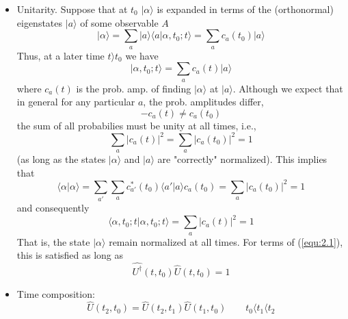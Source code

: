\begin{itemize}
  \item Unitarity. Suppose that at $t_0$ $\vert \alpha\rangle $ is
    expanded in terms of the (orthonormal) eigenstates $\vert a\rangle $
    of some observable $A$
    \begin{equation}
      \vert \alpha\rangle  = \sum_a \vert a\rangle \langle a\vert \alpha,t_0;t\rangle  = \sum_a
      c_a(t_0)\vert a\rangle 
      \label{equ:2.2}
    \end{equation}
    Thus, at a later time $t \rangle  t_0$ we have
    \begin{equation}
      \vert \alpha,t_0;t\rangle  = \sum_a c_a(t) \vert a\rangle 
      \label{equ:2.3}
    \end{equation}
    where $c_a(t)$ is the prob. amp. of finding $\vert \alpha\rangle $
    at $\vert a\rangle $.
    Although we expect that in general for any particular
    $a$, the prob. amplitudes differ,
    $$-
      c_a(t) \neq c_a(t_0)
    $$
    the sum of all probabilies must be unity at all times,
    i.e.,
    \begin{equation}
      \sum_a \vert c_a(t)\vert ^2 = \sum_a \vert c_a(t_0)\vert ^2 = 1
      \label{equ:2.4}
    \end{equation}
    (as long as the states $\vert \alpha\rangle $ and $\vert a\rangle $ are
    "correctly" normalized).
    This implies that
    \begin{equation}
      \langle \alpha\vert \alpha\rangle  = \sum_{a'} \sum_a c_{a'}^*(t_0)
      \langle a'\vert a\rangle   c_a(t_0) = \sum_a \vert c_a(t_0)\vert ^2 = 1
      \label{equ:2.5}
    \end{equation}
    and consequently
    \begin{equation}
      \langle \alpha,t_0;t\vert \alpha,t_0;t\rangle  = \sum_a \vert c_a(t)\vert ^2 = 1
      \label{equ:2.6}
    \end{equation}
    That is, the state $\vert \alpha\rangle $ remain normalized at all
    times. For terms of (\ref{equ:2.1}), this is satisfied as
    long as
    \begin{equation}
      \hat{U^\dagger}(t, t_0) \hat{U}(t,t_0) = 1
      \label{equ:2.7}
    \end{equation}
  \item Time composition:
    \begin{equation}
      \hat{U}(t_2,t_0) = \hat{U}(t_2,t_1) \hat{U}(t_1,t_0)
      \qquad t_0 \langle  t_1 \langle  t_2
      \label{equ:2.8}
    \end{equation}

\end{itemize}
